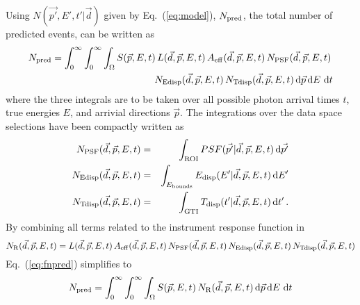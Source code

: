 \documentclass{article}[12pt,a4]
\begin{document}
Using $N(\vec{p'}, E', t' | \vec{d})$ given by Eq.~(\ref{eq:model}), $N_{\rm pred}$, the
total number of predicted events, can be written as
\begin{eqnarray}
N_{\rm pred} = \int_{0}^{\infty} \int_{0}^{\infty} \int_{\Omega} 
  S(\vec{p}, E, t) \,
  L(\vec{d}, \vec{p}, E, t) \,
  A_{\rm eff}(\vec{d}, \vec{p}, E, t) \,
  N_{\rm PSF}(\vec{d}, \vec{p}, E, t) \, \nonumber \\
  N_{\rm Edisp}(\vec{d}, \vec{p}, E, t) \,
  N_{\rm Tdisp}(\vec{d}, \vec{p}, E, t) 
\, {\rm d}\vec{p} \, {\rm d}E \, \,{\rm d}t
\label{eq:fnpred}
\end{eqnarray}
where the three integrals are to be taken over all possible photon arrival times $t$, 
true energies $E$, and arrivial directions $\vec{p}$.
The integrations over the data space selections have been compactly written
as
\begin{eqnarray}
N_{\rm PSF}(\vec{d}, \vec{p}, E, t) & = & 
\int_{\rm ROI} PSF(\vec{p'} | \vec{d}, \vec{p}, E, t) \, {\rm d}\vec{p'} \\
N_{\rm Edisp}(\vec{d}, \vec{p}, E, t) & = & 
\int_{E_{\rm bounds}} E_{\rm disp}(E' | \vec{d}, \vec{p}, E, t) \, {\rm d}E' \\
N_{\rm Tdisp}(\vec{d}, \vec{p}, E, t) & = & 
\int_{\rm GTI} T_{\rm disp}(t' | \vec{d}, \vec{p}, E, t) \, {\rm d}t' \, .
\end{eqnarray}
By combining all terms related to the instrument response function in
\begin{equation}
N_{\rm R}(\vec{d}, \vec{p}, E, t) = 
  L(\vec{d}, \vec{p}, E, t) \,
  A_{\rm eff}(\vec{d}, \vec{p}, E, t) \,
  N_{\rm PSF}(\vec{d}, \vec{p}, E, t) \,
  N_{\rm Edisp}(\vec{d}, \vec{p}, E, t) \,
  N_{\rm Tdisp}(\vec{d}, \vec{p}, E, t)
\label{eq:nirf}
\end{equation}
Eq.~(\ref{eq:fnpred}) simplifies to
\begin{equation}
N_{\rm pred} = \int_{0}^{\infty} \int_{0}^{\infty} \int_{\Omega} 
  S(\vec{p}, E, t) \,
  N_{\rm R}(\vec{d}, \vec{p}, E, t)
\, {\rm d}\vec{p} \, {\rm d}E \, \,{\rm d}t
\end{equation}
\end{document}
